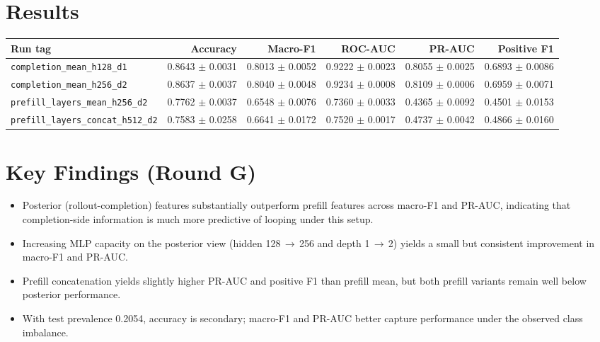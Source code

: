 \documentclass[11pt]{article}
\begin{document}
\section*{Results}
\begin{center}
{\small
\setlength{\tabcolsep}{3pt}
\begin{tabular}{@{}p{3.1cm}rrrrr@{}}
\toprule
Run tag & Accuracy & Macro-F1 & ROC-AUC & PR-AUC & Positive F1 \\
\midrule
\texttt{completion\_mean\_\allowbreak h128\_d1} & 0.8643 $\pm$ 0.0031 & 0.8013 $\pm$ 0.0052 & 0.9222 $\pm$ 0.0023 & 0.8055 $\pm$ 0.0025 & 0.6893 $\pm$ 0.0086 \\
\texttt{completion\_mean\_\allowbreak h256\_d2} & 0.8637 $\pm$ 0.0037 & 0.8040 $\pm$ 0.0048 & 0.9234 $\pm$ 0.0008 & 0.8109 $\pm$ 0.0006 & 0.6959 $\pm$ 0.0071 \\
\texttt{prefill\_layers\_\allowbreak mean\_h256\_d2} & 0.7762 $\pm$ 0.0037 & 0.6548 $\pm$ 0.0076 & 0.7360 $\pm$ 0.0033 & 0.4365 $\pm$ 0.0092 & 0.4501 $\pm$ 0.0153 \\
\texttt{prefill\_layers\_\allowbreak concat\_h512\_d2} & 0.7583 $\pm$ 0.0258 & 0.6641 $\pm$ 0.0172 & 0.7520 $\pm$ 0.0017 & 0.4737 $\pm$ 0.0042 & 0.4866 $\pm$ 0.0160 \\
\bottomrule
\end{tabular}
}
\end{center}

\section*{Key Findings (Round G)}
\begin{itemize}
  \item Posterior (rollout-completion) features substantially outperform prefill features across macro-F1 and PR-AUC,
  indicating that completion-side information is much more predictive of looping under this setup.
  \item Increasing MLP capacity on the posterior view (hidden 128\,$\rightarrow$\,256 and depth 1\,$\rightarrow$\,2)
  yields a small but consistent improvement in macro-F1 and PR-AUC.
  \item Prefill concatenation yields slightly higher PR-AUC and positive F1 than prefill mean,
  but both prefill variants remain well below posterior performance.
  \item With test prevalence 0.2054, accuracy is secondary; macro-F1 and PR-AUC better capture performance
  under the observed class imbalance.
\end{itemize}
\end{document}
